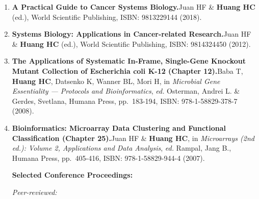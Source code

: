 \documentclass[10pt,a4paper]{article}
\def\newpub#1#2#3{{\boldmath \bf #2.}\newline #1, #3.}
\begin{document}
\begin{enumerate}


\vspace{24pt}
\hspace{-0.4in} {\bf Books \& Chapters:}

\item
\newpub
{Juan HF \& {\bf Huang HC} (ed.)}
{A Practical Guide to Cancer Systems Biology}
{World Scientific Publishing, ISBN: 9813229144 (2018)}

\item
\newpub
{Juan HF \& {\bf Huang HC} (ed.)}
{Systems Biology: Applications in Cancer-related Research}
{World Scientific Publishing, ISBN: 9814324450 (2012)}

\item
\newpub
{Baba T, {\bf Huang HC}, Datsenko K, Wanner BL, Mori H}
{The Applications of Systematic In-Frame, Single-Gene Knockout Mutant Collection of Escherichia coli K-12 (Chapter 12)}
{in {\it Microbial Gene Essentiality --- Protocols and Bioinformatics}, {\it ed.} Osterman, Andrei L. \& Gerdes, Svetlana, Humana Press, pp.~183-194, ISBN: 978-1-58829-378-7 (2008)}

\item
\newpub
{Juan HF \& {\bf Huang HC}}
{Bioinformatics: Microarray Data Clustering and Functional Classification (Chapter 25)}
{in {\it Microarrays (2nd ed.): Volume 2, Applications and Data Analysis}, {\it ed.} Rampal, Jang B., Humana Press, pp.~405-416, ISBN: 978-1-58829-944-4 (2007)}






\vspace{18pt}
\hspace{-0.4in} {\bf Selected Conference Proceedings:}

\vspace{6pt}
\hspace{-0.4in} {\it Peer-reviewed:}


\end{enumerate}
\end{document}
